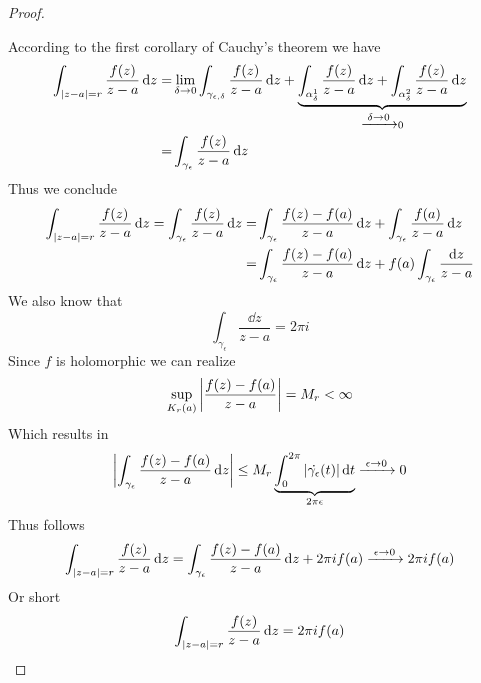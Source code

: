 \documentclass[../../script.tex]{subfiles}
\begin{document}
\begin{proof}
\begin{center}
    \end{center}
    According to the first corollary of Cauchy's theorem we have
    \begin{equation}
    \begin{split}
        \int_{\abs{z-a}=r} \frac{f(z)}{z-a} \dd{z} = &\lim_{\delta \rightarrow 0} \int_{\gamma_{\epsilon, \delta}} \frac{f(z)}{z-a} \dd{z} + \underbrace{\int_{\alpha_{\delta}^1} \frac{f(z)}{z-a} \dd{z} + \int_{\alpha_{\delta}^2} \frac{f(z)}{z-a} \dd{z}}_{\conv{\delta \rightarrow 0} 0} \\
        = &\int_{\gamma_{\epsilon}} \frac{f(z)}{z-a} \dd{z}
    \end{split}
    \end{equation}
    Thus we conclude
    \begin{equation}
    \begin{split}
        \int_{\abs{z-a}=r} \frac{f(z)}{z-a} \dd{z} = \int_{\gamma_{\epsilon}} \frac{f(z)}{z-a} \dd{z} = &\int_{\gamma_{\epsilon}} \frac{f(z) - f(a)}{z-a} \dd{z} + \int_{\gamma_{\epsilon}} \frac{f(a)}{z-a} \dd{z} \\
        = &\int_{\gamma_{\epsilon}} \frac{f(z) - f(a)}{z-a} \dd{z} + f(a) \int_{\gamma_{\epsilon}} \frac{\dd{z}}{z-a}
    \end{split}
    \end{equation}
    We also know that 
    \begin{equation}
        \int_{\gamma_{\epsilon}} \frac{\dd{z}}{z-a} = 2\pi i
    \end{equation}
    Since $f$ is holomorphic we can realize
    \begin{equation}
        \sup_{\cball[r](a)} \left| \frac{f(z) - f(a)}{z - a} \right| = M_r < \infty
    \end{equation}
    Which results in 
    \begin{equation}
        \abs{\int_{\gamma_{\epsilon}} \frac{f(z) - f(a)}{z - a} \dd{z}} \le M_r \underbrace{\int_0^{2\pi} \abs{\dot{\gamma_{\epsilon}}(t)} \dd{t}}_{2\pi\epsilon} \conv{\epsilon \rightarrow 0} 0
    \end{equation}
    Thus follows 
    \begin{equation}
        \int_{|z - a| = r} \frac{f(z)}{z - a} \dd{z} = \int_{\gamma_{\epsilon}} \frac{f(z) - f(a)}{z - a} \dd{z} + 2\pi i f(a) \conv{\epsilon \rightarrow 0} 2\pi i f(a)
    \end{equation}
    Or short 
    \begin{equation}
        \int_{\abs{z - a} = r} \frac{f(z)}{z - a} \dd{z} = 2\pi i f(a)
    \end{equation}
\end{proof}
\end{document}
